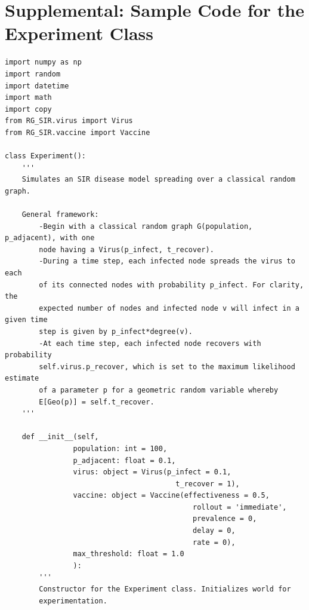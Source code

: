 \documentclass[psamsfonts]{amsart}
\theoremstyle{definition}
\theoremstyle{remark}
\numberwithin{equation}{section}
\begin{document}
\pagebreak

\section{Supplemental: Sample Code for the Experiment Class}

\begin{verbatim}
import numpy as np
import random
import datetime
import math
import copy
from RG_SIR.virus import Virus
from RG_SIR.vaccine import Vaccine

class Experiment():
    '''
    Simulates an SIR disease model spreading over a classical random graph.

    General framework:
        -Begin with a classical random graph G(population, p_adjacent), with one
        node having a Virus(p_infect, t_recover).
        -During a time step, each infected node spreads the virus to each
        of its connected nodes with probability p_infect. For clarity, the
        expected number of nodes and infected node v will infect in a given time
        step is given by p_infect*degree(v).
        -At each time step, each infected node recovers with probability
        self.virus.p_recover, which is set to the maximum likelihood estimate
        of a parameter p for a geometric random variable whereby
        E[Geo(p)] = self.t_recover.
    '''

    def __init__(self,
                population: int = 100,
                p_adjacent: float = 0.1,
                virus: object = Virus(p_infect = 0.1,
                                        t_recover = 1),
                vaccine: object = Vaccine(effectiveness = 0.5,
                                            rollout = 'immediate',
                                            prevalence = 0,
                                            delay = 0,
                                            rate = 0),
                max_threshold: float = 1.0
                ):
        '''
        Constructor for the Experiment class. Initializes world for
        experimentation.


\end{verbatim}
\end{document}
